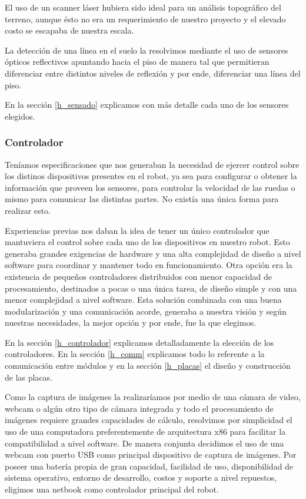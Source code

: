 El uso de un scanner l\'aser hubiera sido ideal para un an\'alisis topogr\'afico del terreno, aunque \'esto
no era un requerimiento de nuestro proyecto y el elevado costo se escapaba de nuestra escala.

La detecci\'on de una l\'inea en el suelo la resolvimos mediante el uso de sensores \'opticos reflectivos
apuntando hacia el piso de manera tal que permitieran diferenciar entre distintos niveles de reflexi\'on
y por ende, diferenciar una l\'inea del piso.

En la secci\'on \ref{h_sensado} explicamos con m\'as detalle cada uno de los sensores elegidos.

\subsubsection{Controlador}
\label{h_ideas_controlador}

Ten\'iamos especificaciones que nos generaban la necesidad de ejercer control sobre los distinos dispositivos
presentes en el robot, ya sea para configurar o obtener la informaci\'on que proveen los sensores, para
controlar la velocidad de las ruedas o mismo para comunicar las distintas partes.
No exist\'ia una \'unica forma para realizar esto.

Experiencias previas nos daban la idea de tener un \'unico controlador que mantuviera el control sobre cada uno
de los dispositivos en nuestro robot.
Esto generaba grandes exigencias de hardware y una alta complejidad de dise\~no a nivel software para coordinar
y mantener todo en funcionamiento.
Otra opci\'on era la existencia de peque\~nos controladores distribuidos con menor capacidad de procesamiento,
destinados a pocas o una \'unica tarea, de dise\~no simple y con una menor complejidad a nivel software.
Esta soluci\'on combinada con una buena modularizaci\'on y una comunicaci\'on acorde, generaba a nuestra visi\'on
y seg\'un nuestras necesidades, la mejor opci\'on y por ende, fue la que elegimos.

En la secci\'on \ref{h_controlador} explicamos detalladamente la elecci\'on de los controladores.
En la secci\'on \ref{h_comm} explicamos todo lo referente a la comunicaci\'on entre m\'odulos y en la
secci\'on \ref{h_placas} el dise\~no y construcci\'on de las placas.

Como la captura de im\'agenes la realizar\'iamos por medio de una c\'amara de video, webcam o alg\'un otro tipo
de c\'amara integrada y todo el procesamiento de im\'agenes requiere grandes capacidades de c\'alculo, resolvimos
por simplicidad el uso de una computadora preferentemente de arquitectura x86 para facilitar la compatibilidad
a nivel software.
De manera conjunta decidimos el uso de una webcam con puerto USB como principal dispositivo de captura de im\'agenes.
Por poseer una bater\'ia propia de gran capacidad, facilidad de uso, disponibilidad de sistema operativo, entorno
de desarrollo, costos y soporte a nivel repuestos, eligimos una netbook como controlador principal del robot.

